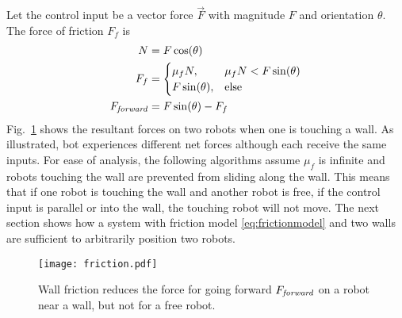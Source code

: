  Let the control input be a vector force $\vec{F}$ with magnitude $F$ and orientation $\theta$.  The force of friction $F_f$ is
\begin{align}
N &= F \cos(\theta) \nonumber\\
F_f &= \begin{cases}  \mu_f N, &  \mu_f N < F \sin(\theta)  \label{eq:frictionmodel} \\ 
F \sin(\theta), & \text{else} \end{cases}  \\%
F_{\text{\emph{forward}}} &=  F \sin(\theta) - F_f  \nonumber
\end{align}
 Fig.~\ref{fig:friction} shows the resultant forces on two robots when one is touching a wall. As illustrated, bot experiences different net forces although each receive the same inputs.
  For ease of analysis, the following algorithms assume $\mu_f$ is infinite and robots touching the wall are prevented from sliding along the wall.
This means that if one robot is touching the wall and another robot is free, if the control input is parallel or into the wall, the touching robot will not move. 
The next section shows how a system with friction model \eqref{eq:frictionmodel} and two walls are sufficient to arbitrarily position two robots. 
\begin{figure}[h]
\begin{center}
\texttt{[image: friction.pdf]} 
\caption{Wall friction reduces the force for going forward $F_{\text{\emph{forward}}}$ on a robot near a wall, but not for a free robot.}
\label{fig:friction}
\end{center}
\end{figure} 




